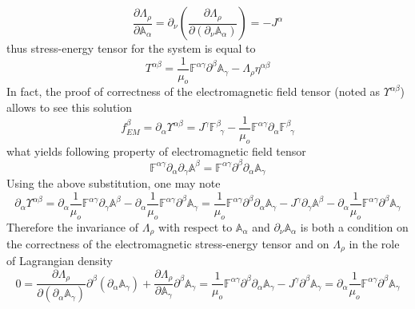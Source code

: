 \documentclass[aps,prx,preprint,groupedaddress,showkeys]{revtex4-2}
\begin{document}
\begin{equation} \label{CLASSLAGNEW}
\frac{\partial \Lambda_{\rho}} {\partial \mathbb{A}_{\alpha}} =  \partial_{\nu}  \left (  \frac{\partial \Lambda_{\rho}}{\partial (\partial_{\nu} \mathbb{A}_{\alpha} )}   \right ) = - J^{\alpha}
\end{equation}
thus stress-energy tensor for the system is equal to
\begin{equation} \label{TensSep1}
T^{\alpha \beta} = \frac{1}{\mu_o}\mathbb{F}^{\alpha \gamma} \partial^{\beta} \mathbb{A}_{\gamma} -  \Lambda_{\rho} \eta^{\alpha \beta}
\end{equation}
In fact, the proof of correctness of the electromagnetic field tensor (noted as $\Upsilon^{\alpha \beta}$) allows to see this solution
\begin{equation} \label{Ups1}
f_{EM}^{\beta} = \partial_{\alpha} \Upsilon^{\alpha \beta} = J^{\gamma}\mathbb{F}^{\beta}_{\, \, \, \gamma} - \frac{1}{\mu_o}\mathbb{F}^{\alpha \gamma} \partial_{\alpha} \mathbb{F}^{\beta}_{\, \, \, \gamma}
\end{equation}
what yields following property of electromagnetic field tensor
\begin{equation} \label{Ups2}
\mathbb{F}^{\alpha \gamma} \partial_{\alpha} \partial_{\gamma} \mathbb{A}^{\beta} 
 = \mathbb{F}^{\alpha \gamma}  \partial^{\beta} \partial_{\alpha} \mathbb{A}_{\gamma} \end{equation}
Using the above substitution, one may note
\begin{equation} \label{TensorProof}
\partial_{\alpha} \Upsilon^{\alpha \beta} = \partial_{\alpha} \frac{1}{\mu_o} \mathbb{F}^{\alpha \gamma} \partial_{\gamma} \mathbb{A}^{\beta} - \partial_{\alpha} \frac{1}{\mu_o} \mathbb{F}^{\alpha \gamma} \partial^{\beta} \mathbb{A}_{\gamma} = \frac{1}{\mu_o} \mathbb{F}^{\alpha \gamma} \partial^{\beta} \partial_{\alpha} \mathbb{A}_{\gamma} - J^{\gamma}\partial_{\gamma} \mathbb{A}^{\beta} - \partial_{\alpha} \frac{1}{\mu_o} \mathbb{F}^{\alpha \gamma} \partial^{\beta} \mathbb{A}_{\gamma}
\end{equation}
Therefore the invariance of $\Lambda_{\rho}$ with respect to $\mathbb{A}_{\alpha}$ and  $\partial_{\nu} \mathbb{A}_{\alpha}$ is both a condition on the correctness of the electromagnetic stress-energy tensor and on $\Lambda_{\rho}$ in the role of Lagrangian density
\begin{equation} \label{TENSCORR}
0 = \frac{\partial \Lambda_{\rho}}{\partial (\partial_{\alpha} \mathbb{A}_{\gamma})} \partial^{\beta} (\partial_{\alpha} \mathbb{A}_{\gamma}) + \frac{\partial \Lambda_{\rho}} {\partial \mathbb{A}_{\gamma}} \partial^{\beta} \mathbb{A}_{\gamma} = \frac{1}{\mu_o} \mathbb{F}^{\alpha \gamma} \partial^{\beta} \partial_{\alpha} \mathbb{A}_{\gamma}  - J^{\gamma} \partial^{\beta} \mathbb{A}_{\gamma} = \partial_{\alpha} \frac{1}{\mu_o} \mathbb{F}^{\alpha \gamma} \partial^{\beta} \mathbb{A}_{\gamma}
\end{equation}
\end{document}
